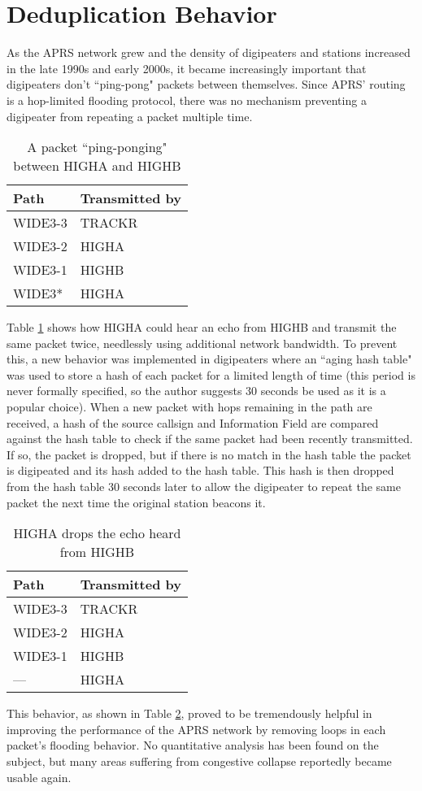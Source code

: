 \section{Deduplication Behavior}

As the APRS network grew and the density of digipeaters and stations increased
in the late 1990s and early 2000s,
it became increasingly important that digipeaters don't ``ping-pong" packets
between themselves.
Since APRS' routing is a hop-limited flooding protocol,
there was no mechanism preventing a digipeater from repeating a packet multiple
time.
\begin{table}[!h]
	\centering
	\begin{tabular}{ | l | l | }
		\hline
		Path & Transmitted by \\ \hline
		WIDE3-3 & TRACKR \\ \hline
		WIDE3-2 & HIGHA \\ \hline
		WIDE3-1 & HIGHB \\ \hline
		WIDE3* & HIGHA \\ \hline
	\end{tabular}
	\caption{A packet ``ping-ponging" between HIGHA and HIGHB}
	\label{tab:widepingpong}
\end{table}

Table \ref{tab:widepingpong} shows how HIGHA could hear an echo from HIGHB
and transmit the same packet twice, needlessly using additional network bandwidth.
To prevent this, a new behavior was implemented in digipeaters where an
``aging hash table" was used to store a hash of each packet for a limited
length of time (this period is never formally specified, so the author
suggests 30 seconds be used as it is a popular choice).
When a new packet with hops remaining in the path are received,
a hash of the source callsign and Information Field are compared against
the hash table to check if the same packet had been recently transmitted.
If so, the packet is dropped, but if there is no match in the hash table
the packet is digipeated and its hash added to the hash table.
This hash is then dropped from the hash table 30 seconds later to allow
the digipeater to repeat the same packet the next time the original station
beacons it.

\begin{table}[!h]
	\centering
	\begin{tabular}{ | l | l | }
		\hline
		Path & Transmitted by \\ \hline
		WIDE3-3 & TRACKR \\ \hline
		WIDE3-2 & HIGHA \\ \hline
		WIDE3-1 & HIGHB \\ \hline
		--- & HIGHA \\ \hline
	\end{tabular}
	\caption{HIGHA drops the echo heard from HIGHB}
	\label{tab:dropecho}
\end{table}
This behavior, as shown in Table \ref{tab:dropecho},
proved to be tremendously helpful in improving the performance
of the APRS network by removing loops in each packet's flooding behavior.
No quantitative analysis has been found on the subject, but many areas suffering
from congestive collapse reportedly became usable again.

